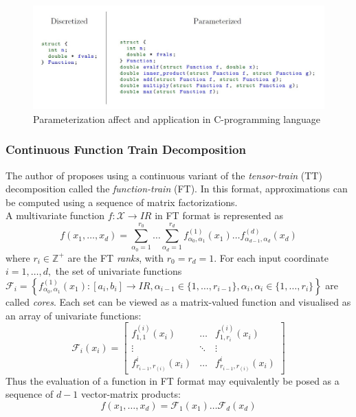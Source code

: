 \documentclass[11pt,draftd]{article}
\def\Real{I\!R}
\begin{document}
\begin{figure}[h!]
	\centering
	\includegraphics[scale = 0.4]{ContinuousLinearAlgebraDifference1}
	\caption{Parameterization affect and application in C-programming language}
\end{figure}

\iffalse
\subsubsection{Continuous Function Train Decomposition} %
The author of \cite{thesis} proposes using a continuous variant of the \textit{tensor-train} (TT) decomposition called the \textit{function-train} (FT). In this format, approximations can be computed using a sequence of matrix factorizations. \\

\noindent A multivariate function $ f : \mathcal{X} \rightarrow \Real $ in FT format is represented as
\begin{equation}
f(x_{1},\dots,x_{d}) = \sum_{\alpha_{0}=1}^{r_{0}}\dots\sum_{\alpha_{d}=1}^{r_{d}} f_{\alpha_{0},\alpha_{1}}^{(1)}(x_{1}) \dots f_{\alpha_{d-1},\alpha_{d}}^{(d)}(x_{d})
\end{equation}
where $ r_{i} \in \mathbb{Z}^{+} $ are the FT \textit{ranks}, with $ r_{0} = r_{d} = 1 $. For each input coordinate $ i = 1,\dots,d, $ the set of univariate functions $ \mathcal{F}_{i} = \left\{ f_{\alpha_{0},\alpha_{1}}^{(1)}(x_{1}) : \left[ a_{i}, b_{i} \right] \rightarrow \Real, \alpha_{i-1} \in \{1,\dots,r_{i-1}\}, \alpha_{i} , \alpha_{i} \in \{1,\dots,r_{i}\}  \right\} $ are called \textit{cores}. Each set can be viewed as a matrix-valued function and visualised as an array of univariate functions:
\begin{equation}
\mathcal{F}_{i}(x_{i}) = \left[ \begin{matrix}
f_{1,1}^{(i)}(x_{i}) 	&	\dots	&	f_{1,r_{i}}^{(i)}(x_{i}) \\
\vdots 				&	\ddots	&	\vdots \\
f_{r_{i-1},r_{(i)}}^{i}(x_{i})	&	\dots	&	f_{r_{i-1},r_{(i)}}^{i}(x_{i})
\end{matrix} \right]
\end{equation}
Thus the evaluation of a function in FT format may equivalently be posed as a sequence of $ d-1 $ vector-matrix products:
\begin{equation}
f(x_{1},\dots,x_{d}) = \mathcal{F}_{1}(x_{1})\dots\mathcal{F}_{d}(x_{d})
\end{equation}
\end{document}
